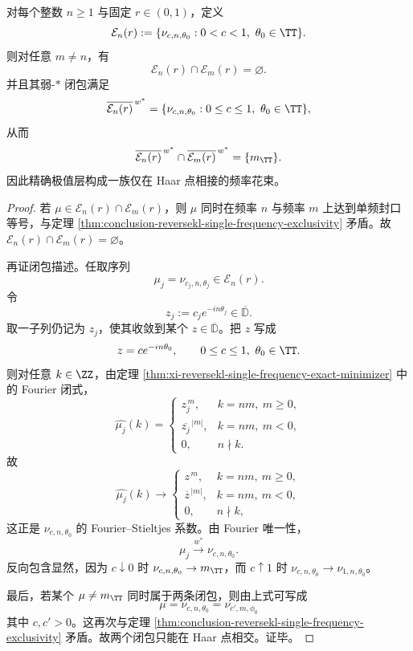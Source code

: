 \begin{corollary}[精确极值层的频率花束闭包]\label{cor:conclusion-reversekl-extremal-frequency-bouquet}
对每个整数 \(n\ge 1\) 与固定 \(r\in(0,1)\)，定义
\[
\mathcal E_n(r):=\{\nu_{c,n,\theta_0}:0<c<1,\ \theta_0\in\TT\}.
\]
则对任意 \(m\neq n\)，有
\[
\mathcal E_n(r)\cap \mathcal E_m(r)=\varnothing.
\]
并且其弱-\(*\) 闭包满足
\[
\overline{\mathcal E_n(r)}^{\,w^\ast}
=
\{\nu_{c,n,\theta_0}:0\le c\le 1,\ \theta_0\in\TT\},
\]
从而
\[
\overline{\mathcal E_n(r)}^{\,w^\ast}\cap \overline{\mathcal E_m(r)}^{\,w^\ast}
=\{m_{\TT}\}.
\]
因此精确极值层构成一族仅在 Haar 点相接的频率花束。
\end{corollary}
\begin{proof}
若 \(\mu\in\mathcal E_n(r)\cap \mathcal E_m(r)\)，则 \(\mu\) 同时在频率 \(n\) 与频率 \(m\) 上达到单频封口等号，与定理 \ref{thm:conclusion-reversekl-single-frequency-exclusivity} 矛盾。故 \(\mathcal E_n(r)\cap \mathcal E_m(r)=\varnothing\)。

再证闭包描述。任取序列
\[
\mu_j=\nu_{c_j,n,\theta_j}\in\mathcal E_n(r).
\]
令
\[
z_j:=c_j e^{-in\theta_j}\in\overline{\mathbb D}.
\]
取一子列仍记为 \(z_j\)，使其收敛到某个 \(z\in\overline{\mathbb D}\)。把 \(z\) 写成
\[
z=ce^{-in\theta_0},\qquad 0\le c\le 1,\ \theta_0\in\TT.
\]
则对任意 \(k\in\ZZ\)，由定理 \ref{thm:xi-reversekl-single-frequency-exact-minimizer} 中的 Fourier 闭式，
\[
\widehat{\mu_j}(k)=
\begin{cases}
z_j^{\,m},& k=nm,\ m\ge 0,\\
\overline{z_j}^{\,|m|},& k=nm,\ m<0,\\
0,& n\nmid k.
\end{cases}
\]
故
\[
\widehat{\mu_j}(k)\longrightarrow
\begin{cases}
z^{\,m},& k=nm,\ m\ge 0,\\
\overline{z}^{\,|m|},& k=nm,\ m<0,\\
0,& n\nmid k,
\end{cases}
\]
这正是 \(\nu_{c,n,\theta_0}\) 的 Fourier--Stieltjes 系数。由 Fourier 唯一性，
\[
\mu_j\stackrel{w^\ast}{\longrightarrow}\nu_{c,n,\theta_0}.
\]
反向包含显然，因为 \(c\downarrow 0\) 时 \(\nu_{c,n,\theta_0}\to m_{\TT}\)，而 \(c\uparrow 1\) 时 \(\nu_{c,n,\theta_0}\to \nu_{1,n,\theta_0}\)。

最后，若某个 \(\mu\neq m_{\TT}\) 同时属于两条闭包，则由上式可写成
\[
\mu=\nu_{c,n,\theta_0}=\nu_{c',m,\phi_0}
\]
其中 \(c,c'>0\)。这再次与定理 \ref{thm:conclusion-reversekl-single-frequency-exclusivity} 矛盾。故两个闭包只能在 Haar 点相交。证毕。
\end{proof}


